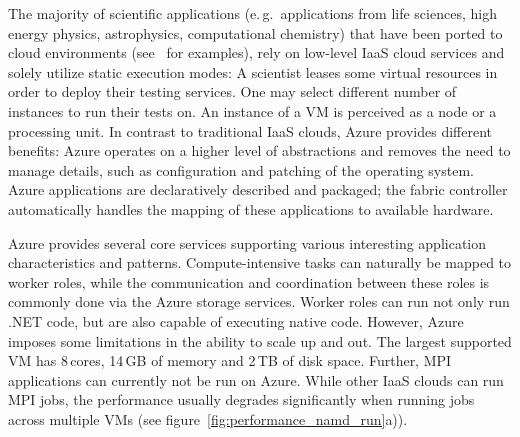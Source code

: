 \documentclass[graybox]{svmult}
\begin{document}

The majority of scientific applications (e.\,g.\ applications from life
sciences, high energy physics, astrophysics, computational chemistry)
that have been ported to cloud environments
(see~\cite{Hill,Begin:2008rq,saga_grid_cloud_interop} for examples),
rely on low-level IaaS cloud services and solely utilize static
execution modes: A scientist leases some virtual resources in order to
deploy their testing services. One may select different number of
instances to run their tests on. An instance of a VM is perceived as a
node or a processing unit. 
In contrast to traditional IaaS clouds, Azure provides different benefits: 
Azure operates on a higher level of abstractions and removes the need to manage details, such as
configuration and patching of the operating system. Azure applications
are declaratively described and packaged; the fabric controller
automatically handles the mapping of these applications to available
hardware.



Azure provides several core services supporting various interesting
application characteristics and patterns. Com\-pute-intensive tasks can
naturally be mapped to worker roles, while the communication and
coordination between these roles is commonly done via the Azure
storage services. Worker roles can run not only run .NET code, but are
also capable of executing native code. However, Azure imposes some
limitations in the ability to scale up and out. The largest supported
VM has 8\,cores, 14\,GB of memory and 2\,TB of disk space.  Further,
MPI applications can currently not be run on Azure. While other IaaS
clouds can run MPI jobs, the performance usually degrades
significantly when running jobs across multiple VMs (see
figure~\ref{fig:performance_namd_run}a)). %

\end{document}

